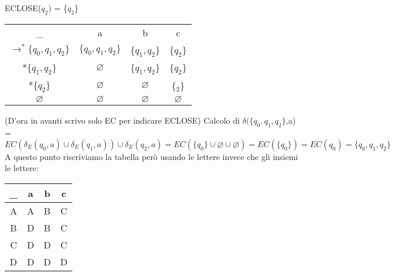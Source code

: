 \documentclass[12pt, a4paper, openany, oneside]{book}
\begin{document}
ECLOSE($q_{2}$) = \{$q_{2}$\} \\
\begin{center}
\begin{tabular}{ |c|c|c|c| } 
\hline
\_ & a & b & c \\ 
$\to^{*}\{q_{0},q_{1},q_{2}\}$ & $\{q_{0},q_{1},q_{2}\}$ & \{$q_{1}, q_{2}$\} 
& \{$q_{2}$\} \\ 
*\{$q_{1}, q_{2}$\} & $\varnothing$ & \{$q_{1}, q_{2}$\} & \{$q_{2}$\}\\ 
*\{$q_{2}$\} & $\varnothing$ & $\varnothing$ & \{$_{2}$\} \\ 
$\varnothing$ & $\varnothing$ & $\varnothing$ & $\varnothing$ \\ 
\hline
\end{tabular}
\end{center}
(D'ora in avanti scrivo solo EC per indicare ECLOSE)
Calcolo di $\delta(\{q_{0},q_{1},q_{2}\}$,a) =  $EC(\delta_{E}(q_{0},a) \cup
\delta_{E}(q_{1},a)) \cup \delta_{E}(q_{2},a) = EC(\{q_{0}\} \cup \varnothing
\cup \varnothing) = EC (\{q_{0}\}) = EC(q_{0}) = \{q_{0}, q_{1}, q_{2}\}$\\
A questo punto riscriviamo la tabella però usando le lettere invece che gli 
insiemi le lettere:
\begin{center}
\begin{tabular}{ |c|c|c|c| } 
\hline
\_ & a & b & c \\ 
\hline
A & A & B & C \\
B & D & B & C \\
C & D & D & C \\
D & D & D & D \\
\hline
\end{tabular}
\end{center}
\end{document}
